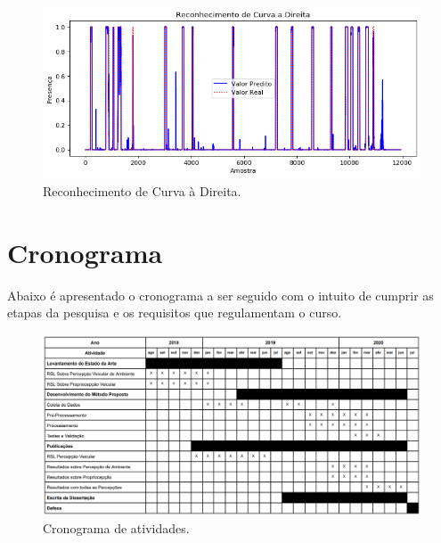 \begin{figure}[h!]
  \centering
  \caption{Reconhecimento de Curva à Direita.}
   \label{fig:resultado_curva_direita}
   \includegraphics[width=1\textwidth]{figuras/fig4_2_6.png}
\end{figure}

\clearpage 
\section{Cronograma}

Abaixo é apresentado o cronograma a ser seguido com o intuito de cumprir as etapas da pesquisa e os requisitos que regulamentam o curso.

\begin{figure}[h!]
  \centering
  \caption{Cronograma de atividades.}
   \label{fig:proprioception_occurrence}
   \includegraphics[width=1\textwidth]{figuras/fig4.png}
\end{figure}

